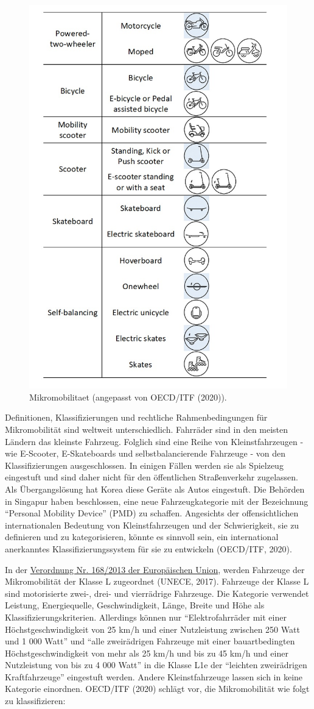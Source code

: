 \documentclass[
]{book}
\begin{document}
\begin{figure}
\includegraphics[width=0.5\linewidth]{image/micromobility} \caption{Mikromobilitaet (angepasst von OECD/ITF (2020)).}\label{fig:unnamed-chunk-23}
\end{figure}

Definitionen, Klassifizierungen und rechtliche Rahmenbedingungen für Mikromobilität sind weltweit unterschiedlich. Fahrräder sind in den meisten Ländern das kleinste Fahrzeug. Folglich sind eine Reihe von Kleinstfahrzeugen - wie E-Scooter, E-Skateboards und selbstbalancierende Fahrzeuge - von den Klassifizierungen ausgeschlossen. In einigen Fällen werden sie als Spielzeug eingestuft und sind daher nicht für den öffentlichen Straßenverkehr zugelassen. Als Übergangslösung hat Korea diese Geräte als Autos eingestuft. Die Behörden in Singapur haben beschlossen, eine neue Fahrzeugkategorie mit der Bezeichnung ``Personal Mobility Device'' (PMD) zu schaffen. Angesichts der offensichtlichen internationalen Bedeutung von Kleinstfahrzeugen und der Schwierigkeit, sie zu definieren und zu kategorisieren, könnte es sinnvoll sein, ein international anerkanntes Klassifizierungssystem für sie zu entwickeln (OECD/ITF, 2020).

In der \href{https://unece.org/resolutions}{Verordnung Nr. 168/2013 der Europäischen Union}, werden Fahrzeuge der Mikromobilität der Klasse L zugeordnet (UNECE, 2017). Fahrzeuge der Klasse L sind motorisierte zwei-, drei- und vierrädrige Fahrzeuge. Die Kategorie verwendet Leistung, Energiequelle, Geschwindigkeit, Länge, Breite und Höhe als Klassifizierungskriterien. Allerdings können nur ``Elektrofahrräder mit einer Höchstgeschwindigkeit von 25 km/h und einer Nutzleistung zwischen 250 Watt und 1 000 Watt'' und ``alle zweirädrigen Fahrzeuge mit einer bauartbedingten Höchstgeschwindigkeit von mehr als 25 km/h und bis zu 45 km/h und einer Nutzleistung von bis zu 4 000 Watt'' in die Klasse L1e der ``leichten zweirädrigen Kraftfahrzeuge'' eingestuft werden. Andere Kleinstfahrzeuge lassen sich in keine Kategorie einordnen. OECD/ITF (2020) schlägt vor, die Mikromobilität wie folgt zu klassifizieren:
\end{document}
